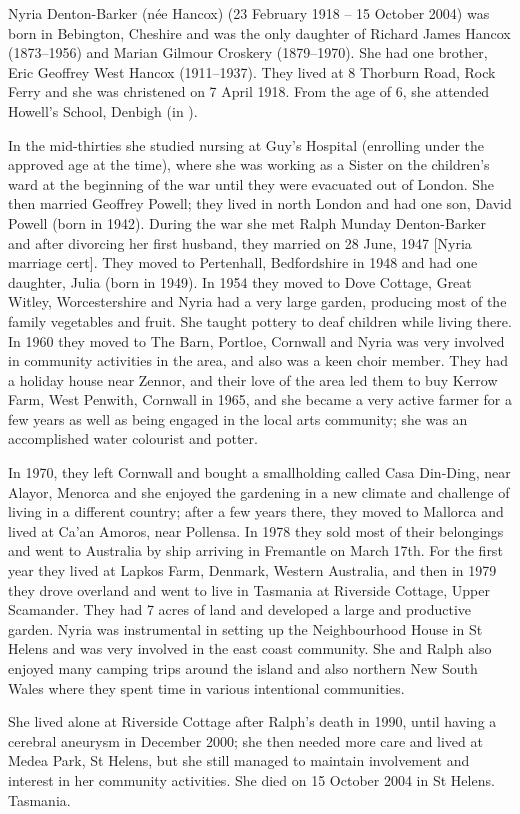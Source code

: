 
Nyria Denton-Barker (n\'{e}e Hancox) (23 February 1918 -- 15 October 2004) was born in Bebington, Cheshire\cite{BMDIndex_JoanNyriaHancox_birth} and was the only daughter of Richard James Hancox (1873--1956) and Marian Gilmour Croskery (1879--1970).\cite{NyriaBirth} She had one brother, Eric Geoffrey West Hancox (1911--1937).  They lived at 8 Thorburn Road, Rock Ferry and she was christened on 7 April 1918.\cite{NyriaChristening}
From the age of 6, she attended Howell's School, Denbigh (in ).\cite{OralHistoryJDB2008}

In the mid-thirties she studied nursing at Guy's Hospital (enrolling under the approved age at the time),  where she was working  as a Sister on the children's ward at the beginning of the war until they were evacuated out of London. She then married Geoffrey Powell;  they lived in north London and had one son, David Powell (born in 1942).  
During the war she met Ralph Munday Denton-Barker and after divorcing her first husband, they married on 28 June, 1947 [Nyria marriage cert].  
They moved to Pertenhall, Bedfordshire in 1948 and had one daughter, Julia (born in 1949).  In 1954 they moved to Dove Cottage, Great Witley, Worcestershire and Nyria had a very large garden, producing most of the family vegetables and fruit. She taught pottery to deaf children while living there.  In 1960 they moved to The Barn, Portloe, Cornwall and Nyria was very involved in community activities in the area, and also was a keen choir member.  They had a holiday house near Zennor, and their love of the area led them to buy Kerrow Farm, West Penwith, Cornwall in 1965,  and she became a very active farmer for a few years as well as being engaged in the local arts community; she was an accomplished water colourist and potter.

In 1970, they left Cornwall and  bought a smallholding called Casa Din-Ding, near Alayor, Menorca and she enjoyed the gardening in  a new climate and challenge of living in a different country;  after a few years there, they moved to Mallorca and lived at Ca'an Amoros, near Pollensa.  
In 1978 they sold most of their belongings and went to Australia by ship arriving in Fremantle on March 17th.  For the first year they lived at Lapkos Farm, Denmark, Western Australia, and then in 1979 they drove overland and went to live in Tasmania at Riverside Cottage, Upper Scamander. They had 7 acres of land and developed a large and productive garden. Nyria was instrumental in setting up the Neighbourhood House in St Helens and was very involved in the east coast community.  She and Ralph also enjoyed many camping trips around the island and also northern New South Wales where they spent time in various intentional communities. 

She lived alone at Riverside Cottage after Ralph's death in 1990, until having a cerebral aneurysm in December 2000;  she then needed more care and lived at Medea Park, St Helens, but she still managed to maintain involvement and interest in her community activities.  She  died on 15 October 2004 in St Helens. Tasmania.
